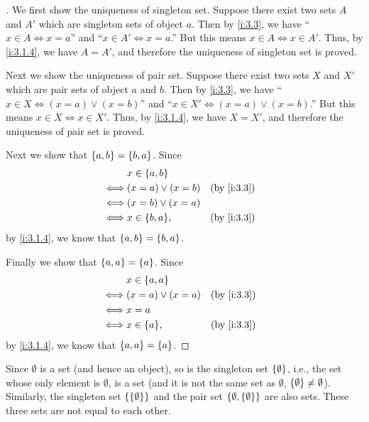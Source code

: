 \begin{proof}[]
  We first show the uniqueness of singleton set.
  Suppose there exist two sets \(A\) and \(A'\) which are singleton sets of object \(a\).
  Then by \cref{i:3.3}, we have ``\(x \in A \iff x = a\)'' and ``\(x \in A' \iff x = a\).''
  But this means \(x \in A \iff x \in A'\).
  Thus, by \cref{i:3.1.4}, we have \(A = A'\), and therefore the uniqueness of singleton set is proved.

  Next we show the uniqueness of pair set.
  Suppose there exist two sets \(X\) and \(X'\) which are pair sets of object \(a\) and \(b\).
  Then by \cref{i:3.3}, we have ``\(x \in X \iff (x = a) \lor (x = b)\)'' and ``\(x \in X' \iff (x = a) \lor (x = b)\).''
  But this means \(x \in X \iff x \in X'\).
  Thus, by \cref{i:3.1.4}, we have \(X = X'\), and therefore the uniqueness of pair set is proved.

  Next we show that \(\left\lbrace a, b\right\rbrace = \left\lbrace b, a\right\rbrace\).
  Since
  \begin{align*}
         & x \in \set{a, b}                     \\
    \iff & (x = a) \lor (x = b) &  & \by{i:3.3} \\
    \iff & (x = b) \lor (x = a)                 \\
    \iff & x \in \set{b, a},    &  & \by{i:3.3}
  \end{align*}
  by \cref{i:3.1.4}, we know that \(\left\lbrace a, b\right\rbrace = \left\lbrace b, a\right\rbrace\).

  Finally we show that \(\left\lbrace a, a\right\rbrace = \left\lbrace a\right\rbrace\).
  Since
  \begin{align*}
         & x \in \set{a, a}                     \\
    \iff & (x = a) \lor (x = a) &  & \by{i:3.3} \\
    \iff & x = a                                \\
    \iff & x \in \set{a},       &  & \by{i:3.3}
  \end{align*}
  by \cref{i:3.1.4}, we know that \(\left\lbrace a, a\right\rbrace = \left\lbrace a\right\rbrace\).
\end{proof}

\begin{eg}\label{i:3.1.10}
  Since \(\emptyset\) is a set (and hence an object), so is the singleton set \(\left\lbrace\emptyset\right\rbrace\), i.e., the set whose only element is \(\emptyset\), is a set (and it is not the same set as \(\emptyset\), \(\left\lbrace\emptyset\right\rbrace \neq \emptyset\)).
  Similarly, the singleton set \(\left\lbrace\left\lbrace\emptyset\right\rbrace\right\rbrace\) and the pair set \(\left\lbrace\emptyset, \left\lbrace\emptyset\right\rbrace\right\rbrace\) are also sets.
  These three sets are not equal to each other.
\end{eg}


